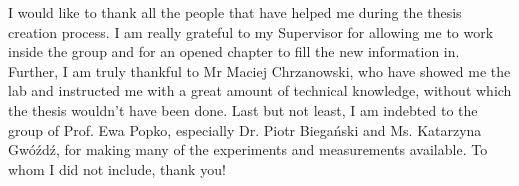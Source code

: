 \documentclass[12pt,twoside]{report}
\numberwithin{equation}{subsection}
\begin{document}
I would like to thank all the people that have helped me during the thesis creation process. I am really grateful to my Supervisor for allowing me to work inside the group and for an opened chapter to fill the new information in. Further, I am truly thankful to Mr Maciej Chrzanowski, who have showed me the lab and instructed me with a great amount of technical knowledge, without which the thesis wouldn't have been done. Last but not least, I am indebted to the group of Prof. Ewa Popko, especially Dr. Piotr Biegański and Ms. Katarzyna Gwóźdź, for making many of the experiments and measurements available. To whom I did not include, thank you!

\tableofcontents
\listoffigures 
\listoftables












\printbibliography
\end{document}
